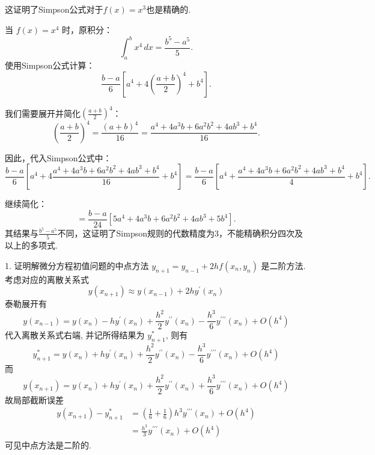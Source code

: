 \begin{tcolorbox}
这证明了Simpson公式对于$f(x) = x^3$也是精确的.

当 $f(x) = x^4$ 时，原积分：
$$\int_a^b x^4 \, dx = \frac{b^5 - a^5}{5}.$$
使用Simpson公式计算：
$$\frac{b-a}{6} \left[a^4 + 4\left(\frac{a+b}{2}\right)^4 + b^4\right].$$

我们需要展开并简化$\left(\frac{a+b}{2}\right)^4$：
$$\left(\frac{a+b}{2}\right)^4 = \frac{(a+b)^4}{16} = \frac{a^4 + 4a^3b + 6a^2b^2 + 4ab^3 + b^4}{16}.$$

因此，代入Simpson公式中：
$$\frac{b-a}{6} \left[a^4 + 4\frac{a^4 + 4a^3b + 6a^2b^2 + 4ab^3 + b^4}{16} + b^4\right] = \frac{b-a}{6} \left[a^4 + \frac{a^4 + 4a^3b + 6a^2b^2 + 4ab^3 + b^4}{4} + b^4\right].$$

继续简化：
$$= \frac{b-a}{24} \left[5a^4 + 4a^3b + 6a^2b^2 + 4ab^3 + 5b^4\right].$$
其结果与$\frac{b^5 - a^5}{5}$不同，这证明了Simpson规则的代数精度为3，不能精确积分四次及以上的多项式.
\end{tcolorbox}



\begin{tcolorbox}[breakable,
		colframe=white!10!jingga, coltitle=white!90!jingga, colback=white!95!jingga, coltext=black, colbacktitle=white!10!jingga, enhanced, fonttitle=\bfseries,fontupper=\normalsize, attach boxed title to top left={yshift=-2mm}, before skip=8pt, after skip=8pt,
		title=解答题]

1. 证明解微分方程初值问题的中点方法 $ y_{n+1}=y_{n-1}+2 h f\left(x_{n}, y_{n}\right) $ 是二阶方法.
   \tcblower
考虑对应的离散关系式
$$
y\left(x_{n+1}\right) \approx y\left(x_{n-1}\right)+2 h y^{\prime}\left(x_{n}\right)
$$
泰勒展开有
$$
y\left(x_{n-1}\right)=y\left(x_{n}\right)-h y^{\prime}\left(x_{n}\right)+\frac{h^{2}}{2} y^{\prime \prime}\left(x_{n}\right)-\frac{h^{3}}{6} y^{\prime \prime \prime}\left(x_{n}\right)+O\left(h^{4}\right)
$$
代入离散关系式右端, 并记所得结果为 $ y_{n+1}^{*} $, 则有
$$
y_{n+1}^{*}=y\left(x_{n}\right)+h y^{\prime}\left(x_{n}\right)+\frac{h^{2}}{2} y^{\prime \prime}\left(x_{n}\right)-\frac{h^{3}}{6} y^{\prime \prime \prime}\left(x_{n}\right)+O\left(h^{4}\right)
$$
而
$$
y\left(x_{n+1}\right)=y\left(x_{n}\right)+h y^{\prime}\left(x_{n}\right)+\frac{h^{2}}{2} y^{\prime \prime}\left(x_{n}\right)+\frac{h^{3}}{6} y^{\prime \prime \prime}\left(x_{n}\right)+O\left(h^{4}\right)
$$
故局部截断误差
$$
\begin{aligned}
y\left(x_{n+1}\right)-y_{n+1}^{*} & =\left(\frac{1}{6}+\frac{1}{6}\right) h^{3} y^{\prime \prime \prime}\left(x_{n}\right)+O\left(h^{4}\right) \\
& = \frac{h^{3}}{3} y^{\prime \prime \prime}\left(x_{n}\right)+O\left(h^{4}\right)
\end{aligned}
$$
可见中点方法是二阶的.

\end{tcolorbox}

